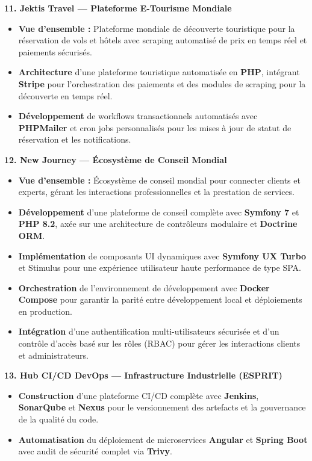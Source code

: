 \documentclass[10pt, letterpaper]{article}
\newenvironment{highlights}{
\begin{itemize}[leftmargin=12pt, itemsep=2pt]
}{
\end{itemize}
}
\begin{document}
\textbf{11. Jektis Travel --- Plateforme E-Tourisme Mondiale}
\begin{highlights}
\item \textbf{Vue d'ensemble :} Plateforme mondiale de découverte touristique pour la réservation de vols et hôtels avec scraping automatisé de prix en temps réel et paiements sécurisés.
\item \textbf{Architecture} d'une plateforme touristique automatisée en \textbf{PHP}, intégrant \textbf{Stripe} pour l'orchestration des paiements et des modules de scraping pour la découverte en temps réel.
\item \textbf{Développement} de workflows transactionnels automatisés avec \textbf{PHPMailer} et cron jobs personnalisés pour les mises à jour de statut de réservation et les notifications.
\end{highlights}

\textbf{12. New Journey --- Écosystème de Conseil Mondial}
\begin{highlights}
\item \textbf{Vue d'ensemble :} Écosystème de conseil mondial pour connecter clients et experts, gérant les interactions professionnelles et la prestation de services.
\item \textbf{Développement} d'une plateforme de conseil complète avec \textbf{Symfony 7} et \textbf{PHP 8.2}, axée sur une architecture de contrôleurs modulaire et \textbf{Doctrine ORM}.
\item \textbf{Implémentation} de composants UI dynamiques avec \textbf{Symfony UX Turbo} et Stimulus pour une expérience utilisateur haute performance de type SPA.
\item \textbf{Orchestration} de l'environnement de développement avec \textbf{Docker Compose} pour garantir la parité entre développement local et déploiements en production.
\item \textbf{Intégration} d'une authentification multi-utilisateurs sécurisée et d'un contrôle d'accès basé sur les rôles (RBAC) pour gérer les interactions clients et administrateurs.
\end{highlights}

\textbf{13. Hub CI/CD DevOps --- Infrastructure Industrielle (ESPRIT)}
\begin{highlights}
\item \textbf{Construction} d'une plateforme CI/CD complète avec \textbf{Jenkins}, \textbf{SonarQube} et \textbf{Nexus} pour le versionnement des artefacts et la gouvernance de la qualité du code.
\item \textbf{Automatisation} du déploiement de microservices \textbf{Angular} et \textbf{Spring Boot} avec audit de sécurité complet via \textbf{Trivy}.
\end{highlights}
\end{document}
